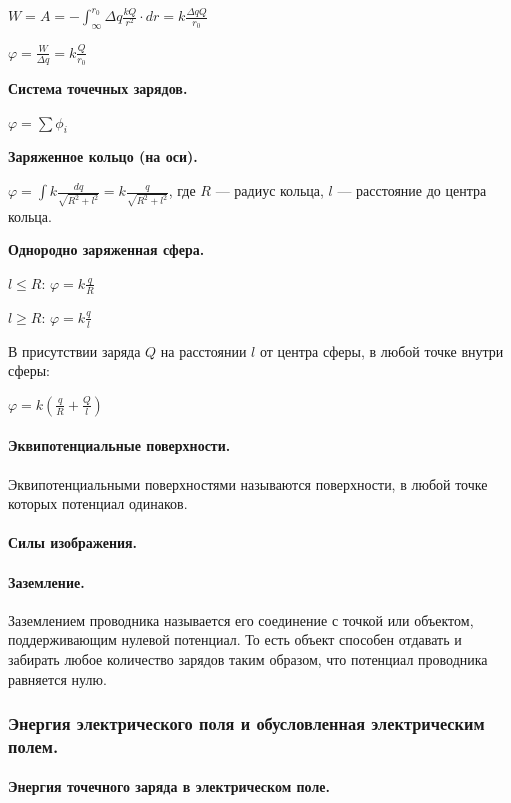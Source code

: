 \documentclass{article}
\begin{document}
                \(W = A = -\int_\infty^{r_0} \Delta q\frac{kQ}{r^2} \cdot dr = k\frac{\Delta q Q}{r_0}\)

                \(\varphi = \frac{W}{\Delta q} = k\frac{Q}{r_0}\)

                \textbf{Система точечных зарядов.}
                
                \(\varphi = \sum{\phi_i}\)

                \textbf{Заряженное кольцо (на оси).}

                \(\varphi = \int k\frac{dq}{\sqrt{R^2 + l^2}} = k\frac{q}{\sqrt{R^2 + l^2}}\), где \(R\) --- радиус кольца, \(l\) --- расстояние до центра кольца.

                \textbf{Однородно заряженная сфера.}
                
                \(l \leq R\): \(\varphi = k\frac{q}{R}\)

                \(l \geq R\): \(\varphi = k\frac{q}{l}\)

                В присутствии заряда \(Q\) на расстоянии \(l\) от центра сферы, в любой точке внутри сферы:

                \(\varphi = k(\frac{q}{R} + \frac{Q}{l})\)
            \paragraph{Эквипотенциальные поверхности.}
                Эквипотенциальными поверхностями называются поверхности, в любой точке которых потенциал одинаков.
            \paragraph{Силы изображения.}
            \paragraph{Заземление.}
                Заземлением проводника называется его соединение с точкой или объектом, поддерживающим нулевой потенциал. То есть объект способен отдавать и забирать любое количество зарядов таким образом, что потенциал проводника равняется нулю.
        \subsubsection{Энергия электрического поля и обусловленная электрическим полем.}
            \paragraph{Энергия точечного заряда в электрическом поле.}
\end{document}
